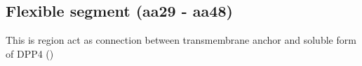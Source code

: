 \subsection{Flexible segment (aa29 - aa48)}

This is region act as connection between transmembrane anchor and soluble form of DPP4  ()
